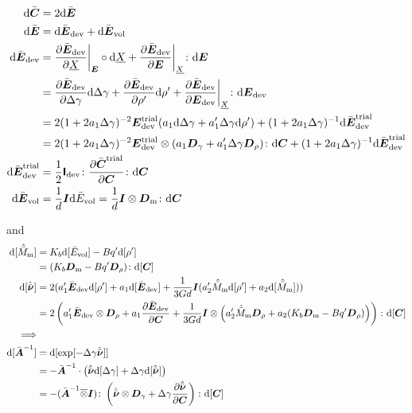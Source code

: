\documentclass[a4paper,11pt]{article}
\newcommand{\ootimes}{\overline{\otimes}}
\newcommand{\tf}[1]{\text{\boldmath $\sf #1$}}
\newcommand{\ts}[1]{\text{\boldmath $#1$}}
\newcommand{\pderiv}[2]{\frac{\partial #1}{\partial #2}}
\newcommand{\dev}{{\rm dev}}
\newcommand{\vol}{{\rm vol}}
\newcommand{\trial}{{\rm trial}}
\newcommand{\rmd}{{\rm d}}
\newcommand{\rmm}{{\rm m}}
\begin{document}
\begin{align*}
	\rmd\bar{\ts C} &= 2 \rmd \bar{\ts E}\\
	\rmd\bar{\ts E} &= \rmd\bar{\ts E}_\dev + \rmd\bar{\ts E}_\vol\\
	\rmd\bar{\ts E}_\dev &= \pderiv{\bar{\ts E}_\dev}{\underline X}\bigg|_{\ts E}\circ\rmd\underline X
		+ \pderiv{\bar{\ts E}_\dev}{\ts E}\bigg|_{\underline X}\colon\rmd\ts E \\
		&= \pderiv{\bar{\ts E}_\dev}{\Delta\gamma}\rmd\Delta\gamma +
		\pderiv{\bar{\ts E}_\dev}{\rho'}\rmd\rho' +
		\pderiv{\bar{\ts E}_\dev}{\ts E_\dev}\bigg|_{\underline X}\colon\rmd\ts E_\dev\\
		&= 2(1+2 a_1 \Delta\gamma)^{-2} \ts E_\dev^\trial(a_1\rmd\Delta\gamma + a_1'\Delta\gamma\rmd\rho') + 
		(1+2 a_1 \Delta\gamma)^{-1}\rmd\bar{\ts E}_\dev^\trial\\
		&= 2(1+2 a_1 \Delta\gamma)^{-2}\ts E_\dev^\trial\otimes(a_1\ts D_\gamma + a_1'\Delta\gamma\ts D_\rho)\colon\rmd\ts C + 
		(1+2 a_1 \Delta\gamma)^{-1}\rmd\bar{\ts E}_\dev^\trial\\
	\rmd\bar{\ts E}_\dev^\trial &= \frac12 \tf I_\dev\colon
		\pderiv{\bar{\ts C}^\trial}{\ts C}\colon\rmd\ts C\\
	\rmd\bar{\ts E}_\vol &= \frac1d\ts I\rmd\bar{E}_\vol = \frac1d\ts I\otimes \ts D_\rmm \colon \rmd\ts C
\end{align*}

and 
\begin{align*}
	\rmd[\hat{\bar M}_\rmm] &= K_b \rmd[\bar E_\vol] - B q' \rmd[\rho']\\
		&= (K_b \ts D_\rmm - B q' \ts D_\rho)\colon\rmd[\ts C]\\
	\rmd[\hat{\bar{\ts\nu}}] &= 2(a_1'\bar{\ts E}_\dev\rmd[\rho'] + a_1\rmd[\bar{\ts E}_\dev]
		+ \frac{1}{3Gd}\ts I(a_2'\hat{\bar{M}}_\rmm\rmd[\rho'] + a_2\rmd[\hat{\bar M}_\rmm]))\\
		&= 2\left(a_1'\bar{\ts E}_\dev\otimes\ts D_\rho + a_1\pderiv{\bar{\ts E}_\dev}{\ts C}
		+ \frac{1}{3Gd}\ts I\otimes\left(a_2'\hat{\bar{M}}_\rmm\ts D_\rho + a_2(K_b \ts D_\rmm - B q' \ts D_\rho)\right)\right)\colon\rmd[\ts C]\\
	\Longrightarrow\\
	\rmd[\bar{\ts A}^{-1}] &= \rmd[\exp[-\Delta\gamma\hat{\bar{\ts\nu}}]]\\
		&= -\bar{\ts A}^{-1}\cdot\left(\hat{\bar{\ts\nu}}\rmd[\Delta\gamma] + \Delta\gamma\rmd[\hat{\bar{\ts\nu}}]\right)\\
		&= -(\bar{\ts A}^{-1}\ootimes\ts I)\colon\left(\hat{\bar{\ts\nu}}\otimes\ts D_\gamma + \Delta\gamma\pderiv{\hat{\bar{\ts\nu}}}{\ts C}\right)\colon\rmd[\ts C]
\end{align*}
\end{document}
